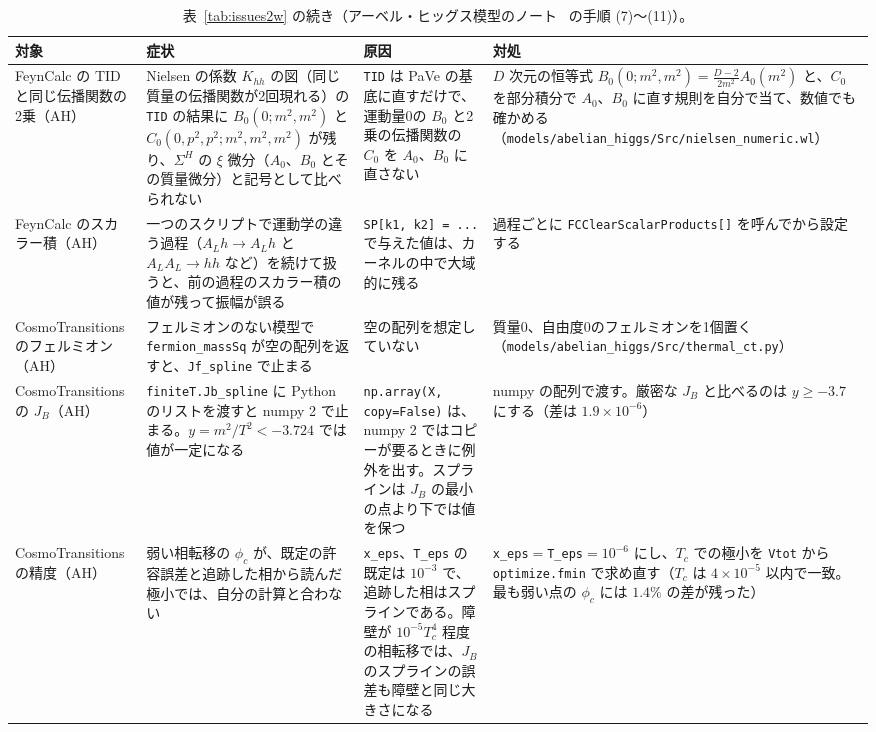 \documentclass[a4paper,10pt]{ltjsarticle}
\begin{document}
\begin{table}[tbp]
\centering\footnotesize
\caption{表~\ref{tab:issues2w} の続き（アーベル・ヒッグス模型のノート~\cite{ahnote} の手順 (7)〜(11)）。}
\label{tab:issues2x}
\begin{tabularx}{\linewidth}{>{\raggedright\arraybackslash}p{2.4cm}>{\raggedright\arraybackslash}X>{\raggedright\arraybackslash}X>{\raggedright\arraybackslash}X}
\toprule
\textbf{対象} & \textbf{症状} & \textbf{原因} & \textbf{対処} \\
\midrule
FeynCalc の TID と同じ伝播関数の2乗（AH） & Nielsen の係数 $K_{hh}$ の図（同じ質量の伝播関数が2回現れる）の \texttt{TID} の結果に $B_0(0;m^2,m^2)$ と $C_0(0,p^2,p^2;m^2,m^2,m^2)$ が残り、$\Sigma^H$ の $\xi$ 微分（$A_0$、$B_0$ とその質量微分）と記号として比べられない & \texttt{TID} は PaVe の基底に直すだけで、運動量0の $B_0$ と2乗の伝播関数の $C_0$ を $A_0$、$B_0$ に直さない & $D$ 次元の恒等式 $B_0(0;m^2,m^2)=\frac{D-2}{2m^2}A_0(m^2)$ と、$C_0$ を部分積分で $A_0$、$B_0$ に直す規則を自分で当て、数値でも確かめる（\nolinkurl{models/abelian_higgs/Src/nielsen_numeric.wl}） \\
FeynCalc のスカラー積（AH） & 一つのスクリプトで運動学の違う過程（$A_Lh\to A_Lh$ と $A_LA_L\to hh$ など）を続けて扱うと、前の過程のスカラー積の値が残って振幅が誤る & \texttt{SP[k1, k2] = ...} で与えた値は、カーネルの中で大域的に残る & 過程ごとに \texttt{FCClearScalarProducts[]} を呼んでから設定する \\
CosmoTransitions のフェルミオン（AH） & フェルミオンのない模型で \texttt{fermion\_massSq} が空の配列を返すと、\texttt{Jf\_spline} で止まる & 空の配列を想定していない & 質量0、自由度0のフェルミオンを1個置く（\nolinkurl{models/abelian_higgs/Src/thermal_ct.py}） \\
CosmoTransitions の $J_B$（AH） & \texttt{finiteT.Jb\_spline} に Python のリストを渡すと numpy 2 で止まる。$y=m^2/T^2<-3.724$ では値が一定になる & \texttt{np.array(X, copy=False)} は、numpy 2 ではコピーが要るときに例外を出す。スプラインは $J_B$ の最小の点より下では値を保つ & numpy の配列で渡す。厳密な $J_B$ と比べるのは $y\ge-3.7$ にする（差は $1.9\times10^{-6}$） \\
CosmoTransitions の精度（AH） & 弱い相転移の $\phi_c$ が、既定の許容誤差と追跡した相から読んだ極小では、自分の計算と合わない & \texttt{x\_eps}、\texttt{T\_eps} の既定は $10^{-3}$ で、追跡した相はスプラインである。障壁が $10^{-5}T_c^4$ 程度の相転移では、$J_B$ のスプラインの誤差も障壁と同じ大きさになる & \texttt{x\_eps}$=$\texttt{T\_eps}$=10^{-6}$ にし、$T_c$ での極小を \texttt{Vtot} から \texttt{optimize.fmin} で求め直す（$T_c$ は $4\times10^{-5}$ 以内で一致。最も弱い点の $\phi_c$ には $1.4\%$ の差が残った） \\

\end{tabularx}
\end{table}
\end{document}
